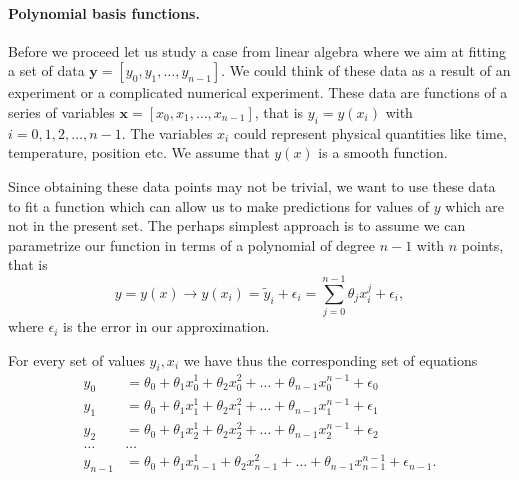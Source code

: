 \documentclass[%
oneside,                 %
final,                   %
10pt]{article}
\newenvironment{block_mdfboxadmon}[1][]{
\begin{block_mdfboxmdframed}[frametitle=#1]
}
{
\end{block_mdfboxmdframed}
}
\begin{document}
\paragraph{Polynomial basis functions.}

\begin{block_mdfboxadmon}[]
Before we proceed let us study a case from linear algebra where we aim at fitting a set of data $\bm{y}=[y_0,y_1,\dots,y_{n-1}]$. We could think of these data as a result of an experiment or a complicated numerical experiment. These data are functions of a series of variables $\bm{x}=[x_0,x_1,\dots,x_{n-1}]$, that is $y_i = y(x_i)$ with $i=0,1,2,\dots,n-1$. The variables $x_i$ could represent physical quantities like time, temperature, position etc. We assume that $y(x)$ is a smooth function. 

Since obtaining these data points may not be trivial, we want to use these data to fit a function which can allow us to make predictions for values of $y$ which are not in the present set. The perhaps simplest approach is to assume we can parametrize our function in terms of a polynomial of degree $n-1$ with $n$ points, that is
\[
y=y(x) \rightarrow y(x_i)=\tilde{y}_i+\epsilon_i=\sum_{j=0}^{n-1} \theta_j x_i^j+\epsilon_i,
\]
where $\epsilon_i$ is the error in our approximation.
\end{block_mdfboxadmon} %





\begin{block_mdfboxadmon}[]
For every set of values $y_i,x_i$ we have thus the corresponding set of equations
\begin{align*}
y_0&=\theta_0+\theta_1x_0^1+\theta_2x_0^2+\dots+\theta_{n-1}x_0^{n-1}+\epsilon_0\\
y_1&=\theta_0+\theta_1x_1^1+\theta_2x_1^2+\dots+\theta_{n-1}x_1^{n-1}+\epsilon_1\\
y_2&=\theta_0+\theta_1x_2^1+\theta_2x_2^2+\dots+\theta_{n-1}x_2^{n-1}+\epsilon_2\\
\dots & \dots \\
y_{n-1}&=\theta_0+\theta_1x_{n-1}^1+\theta_2x_{n-1}^2+\dots+\theta_{n-1}x_{n-1}^{n-1}+\epsilon_{n-1}.\\
\end{align*}
\end{block_mdfboxadmon} %




\end{document}
